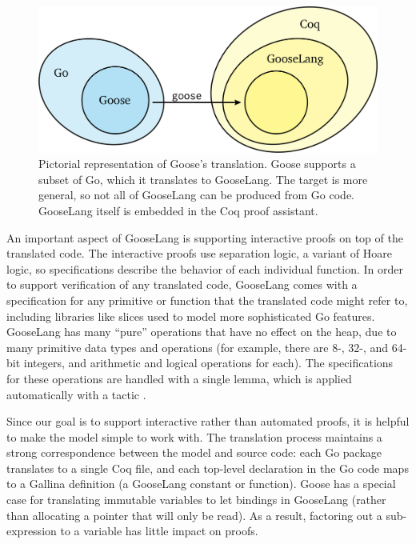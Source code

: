 \begin{figure}
  \centering
  \includegraphics{fig/goose.png}
  \vspace{0.5\baselineskip}
  \caption[Representation of Goose's translation support]%
  {Pictorial representation of Goose's translation. Goose supports a subset of
    Go, which it translates to GooseLang. The target is more general, so not all
    of GooseLang can be produced from Go code. GooseLang itself is embedded in
    the Coq proof assistant.}
  \label{fig:goose:overview}
\end{figure}

An important aspect of GooseLang is supporting interactive proofs on top
of the translated code. The interactive proofs use separation logic, a
variant of Hoare logic, so specifications describe the behavior of each
individual function. In order to support verification of any translated
code, GooseLang comes with a specification for any primitive or function
that the translated code might refer to, including libraries like slices
used to model more sophisticated Go features. GooseLang has many
``pure'' operations that have no effect on the heap, due to many
primitive data types and operations (for example, there are 8-,
32-, and 64-bit integers, and arithmetic and logical operations for
each). The specifications for these operations are handled with a single
lemma, which is applied automatically with a tactic .

Since our goal is to support interactive rather than automated proofs,
it is helpful to make the model simple to work with. The translation process maintains
a strong correspondence between the model and source code: each Go
package translates to a single Coq file, and each top-level declaration
in the Go code maps to a Gallina definition (a GooseLang constant or
function). Goose has a special case for translating immutable variables
to let bindings in GooseLang (rather than allocating a pointer that will
only be read). As a result, factoring out a sub-expression to a variable
has little impact on proofs.

